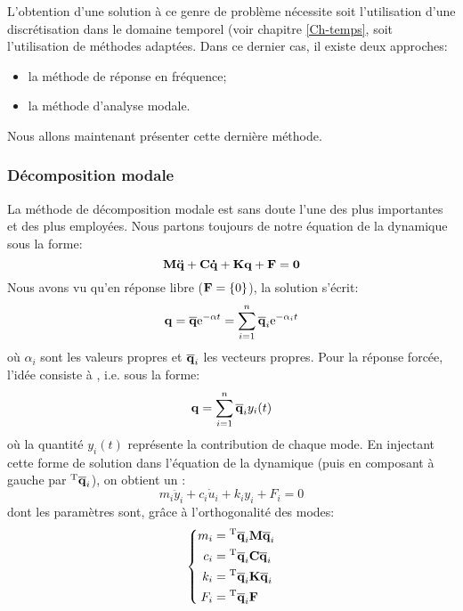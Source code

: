 L'obtention d'une solution à ce genre de problème nécessite soit l'utilisation d'une discrétisation
dans le domaine temporel (voir chapitre \ref{Ch-temps}, soit l'utilisation de méthodes adaptées.
Dans ce dernier cas, il existe deux approches:
\begin{itemize}
   \item la méthode de réponse en fréquence;
   \item la méthode d'analyse modale.
\end{itemize}
Nous allons maintenant présenter cette dernière méthode.

\medskip
\subsubsection{Décomposition modale}
La méthode de décomposition modale est sans doute l'une des plus importantes et des plus
employées.
\medskipvm
Nous partons toujours de notre équation de la dynamique sous la forme:
\begin{equation} \MM{M}\VV{\ddot{q}}+\MM{C}\VV{\dot{q}}+\MM{K}\VV{q}+\VV{F} = \VV{0} \end{equation}
\medskipvm
Nous avons vu qu'en réponse libre ($\VV{F}=\{0\}$), la solution s'écrit:
\begin{equation} \VV{q} = \VV{\overline{q}} \mathrm{e}^{-\alpha t} = \dsum_{i=1}^n \VV{\overline{q}}_i \mathrm{e}^{-\alpha_i t} \end{equation}
où $\alpha_i$ sont les valeurs propres et $\VV{\overline{q}}_i$ les vecteurs propres.
\medskipvm
Pour la réponse forcée, l'idée consiste à , i.e. sous la forme:
\begin{equation} \VV{q} = \dsum_{i=1}^n \VV{\overline{q}}_i y_i(t) \end{equation}
où la quantité $y_i(t)$ représente la contribution de chaque mode.
\medskipvm
En injectant cette forme de solution dans l'équation de la dynamique (puis en composant à gauche par
${}^\mathrm{T}\mathbf{\overline{q}}_i$), on obtient un :
\begin{equation} m_i\ddot{y}_i+c_i\dot{u}_i+k_iy_i+F_i = 0 \end{equation}
dont les paramètres sont, grâce à l'orthogonalité des modes:
\begin{equation}\left\{
\begin{aligned}
	m_i &= \LL{\overline{q}}_i\MM{M}\VV{\overline{q}}_i\\
	c_i &= \LL{\overline{q}}_i\MM{C}\VV{\overline{q}}_i\\
	k_i &= \LL{\overline{q}}_i\MM{K}\VV{\overline{q}}_i\\
	F_i &= \LL{\overline{q}}_i\VV{F}
\end{aligned}
\right.\end{equation}
